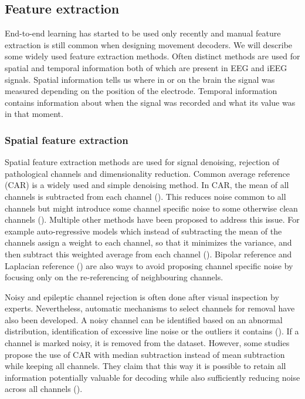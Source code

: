 \subsection{Feature extraction}
End-to-end learning has started to be used only recently and manual feature extraction is still common when designing movement decoders.
We will describe some widely used feature extraction methods. 
Often distinct methods are used for spatial and temporal information both of which are present in EEG and iEEG signals. 
Spatial information tells us where in or on the brain the signal was measured depending on the position of the electrode.
Temporal information contains information about when the signal was recorded and what its value was in that moment.
\subsubsection{Spatial feature extraction}
Spatial feature extraction methods are used for signal denoising, rejection of pathological channels and dimensionality reduction.
 Common average reference (CAR) is a widely used and simple denoising method.
 In CAR, the mean of all channels is subtracted from each channel (\cite{liu-effects-2015}).
 This reduces noise common to all channels but might introduce some channel specific noise to some otherwise clean channels (\cite{volkova-review}). 
 Multiple other methods have been proposed to address this issue.
 For example auto-regressive models which instead of subtracting the mean of the channels assign a weight to each channel, so that it minimizes the variance, and then subtract this weighted average from each channel (\cite{adaptive-laplacian-reference}).
 Bipolar reference and Laplacian reference (\cite{yao2019reference, laplacian-reference}) are also ways to avoid proposing channel specific noise by focusing only on the re-referencing of neighbouring channels.
 
 
Noisy and epileptic channel rejection is often done after visual inspection by experts. Nevertheless, automatic mechanisms to select channels for removal have also been developed. A noisy channel can be identified based on an abnormal distribution, identification of excessive line noise or the outliers it contains (\cite{liu-effects-2015}). If a channel is marked noisy, it is removed from the dataset. However, some studies propose the use of CAR with median subtraction instead of mean subtraction while keeping all channels. They claim that this way it is possible to retain all information potentially valuable for decoding while also sufficiently reducing noise across all channels (\cite{liu-effects-2015}). 

